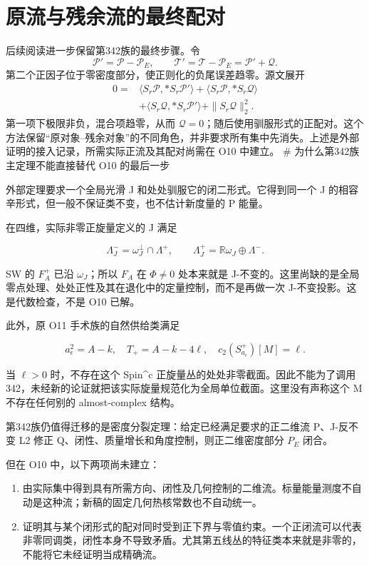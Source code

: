 \documentclass[UTF8,11pt,fontset=none]{ctexart}
\providecommand{\tightlist}{\setlength{\itemsep}{1pt}\setlength{\parskip}{0pt}}
\begin{document}
\section{原流与残余流的最终配对}\label{ch6:ux539fux6d41ux4e0eux6b8bux4f59ux6d41ux7684ux6700ux7ec8ux914dux5bf9}

后续阅读进一步保留第342族的最终步骤。令 \[
\mathscr P'=\mathscr P-\mathscr P_E,\qquad
\mathscr T'=\mathscr T-\mathscr P_E=\mathscr P'+\mathscr Q.
\] 第二个正因子位于零密度部分，使正则化的负尾误差趋零。源文展开 \[
\begin{aligned}
0={}&\langle S_r\mathscr P,*S_r\mathscr P'\rangle
+\langle S_r\mathscr P,*S_r\mathscr Q\rangle\\
&+\langle S_r\mathscr Q,*S_r\mathscr P'\rangle
+\|S_r\mathscr Q\|_2^2.
\end{aligned}
\] 第一项下极限非负，混合项趋零，从而 \(\mathscr Q=0\)；随后使用驯服形式的正配对。这个方法保留``原对象--残余对象''的不同角色，并非要求所有集中先消失。上述是外部证明的接入记录，所需实际正流及其配对尚需在 O10 中建立。\cite{OAI342} \# 为什么第342族主定理不能直接替代 O10 的最后一步

外部定理要求一个全局光滑 J 和处处驯服它的闭二形式。它得到同一个 J 的相容辛形式，但一般不保证类不变，也不估计新度量的 P 能量。

在四维，实际非零正旋量定义的 J 满足

\[
 \Lambda_J^-=\omega_J^\perp\cap\Lambda^+,
 \qquad \Lambda_J^+=\mathbb R\omega_J\oplus\Lambda^-.
\]

SW 的 \(F_A^+\) 已沿 \(\omega_J\)；所以 \(F_A\) 在 \(\Phi\ne0\) 处本来就是 J-不变的。这里尚缺的是全局零点处理、处处正性及其在退化中的定量控制，而不是再做一次 J-不变投影。这是代数检查，不是 O10 已解。

此外，原 O11 手术族的自然供给类满足

\[
 a_\epsilon^2=A-k,
 \quad T_+=A-k-4\ell,
 \quad c_2(S^+_{a_\epsilon})[M]=\ell.
\]

当 \(\ell>0\) 时，不存在这个 Spin\^{}c 正旋量丛的处处非零截面。因此不能为了调用342，未经新的论证就把该实际旋量规范化为全局单位截面。这里没有声称这个 M 不存在任何别的 almost-complex 结构。

第342族仍值得迁移的是密度分裂定理：给定已经满足要求的正二维流 P、J-反不变 L2 修正 Q、闭性、质量增长和角度控制，则正二维密度部分 \(P_E\) 闭合。

但在 O10 中，以下两项尚未建立：

\begin{enumerate}
\def\labelenumi{\arabic{enumi}.}
\tightlist
\item
  由实际集中得到具有所需方向、闭性及几何控制的二维流。标量能量测度不自动是这种流；新稿的固定几何热核常数也不自动统一。
\item
  证明其与某个闭形式的配对同时受到正下界与零值约束。一个正闭流可以代表非零同调类，闭性本身不导致矛盾。尤其第五线丛的特征类本来就是非零的，不能将它未经证明当成精确流。
\end{enumerate}
\end{document}
